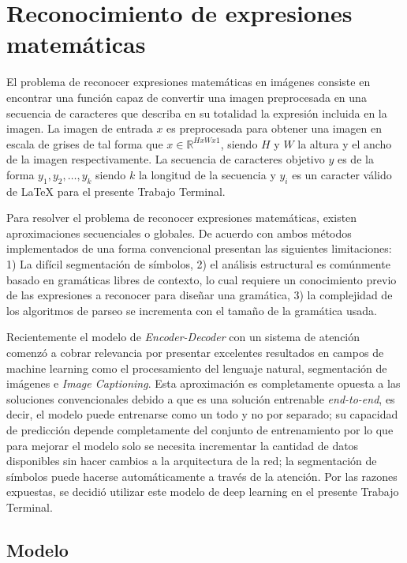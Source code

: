 \newpage
\section{Reconocimiento de expresiones matemáticas}

El problema de reconocer expresiones matemáticas en imágenes consiste en encontrar una función capaz de convertir una imagen preprocesada en una secuencia de caracteres que describa en su totalidad la expresión incluida en la imagen. La imagen de entrada $x$ es preprocesada para obtener una imagen en escala de grises de tal forma que $x \in \mathbb{R} ^ {H x W x 1}$, siendo $H$ y $W$ la altura y el ancho de la imagen respectivamente. La secuencia de caracteres objetivo $y$ es de la forma $y_{1}, y_{2}, \dots , y_{k}$ siendo $k$ la longitud de la secuencia y $y_{i}$ es un caracter válido de \LaTeX{} para el presente Trabajo Terminal.

Para resolver el problema de reconocer expresiones matemáticas, existen aproximaciones secuenciales o globales. De acuerdo con \cite{superprecision} ambos métodos implementados de una forma convencional presentan las siguientes limitaciones: 1) La difícil segmentación de símbolos, 2) el análisis estructural es comúnmente basado en gramáticas libres de contexto, lo cual requiere un conocimiento previo de las expresiones a reconocer para diseñar una gramática, 3) la complejidad de los algoritmos de parseo se incrementa con el tamaño de la gramática usada.

Recientemente el modelo de \textit{Encoder-Decoder} con un sistema de atención comenzó a cobrar relevancia por presentar excelentes resultados en campos de machine learning como el procesamiento del lenguaje natural, segmentación de imágenes e \textit{Image Captioning}. Esta aproximación es completamente opuesta a las soluciones convencionales debido a que es una solución entrenable \textit{end-to-end}, es decir, el modelo puede entrenarse como un todo y no por separado; su capacidad de predicción depende completamente del conjunto de entrenamiento por lo que para mejorar el modelo solo se necesita incrementar la cantidad de datos disponibles sin hacer cambios a la arquitectura de la red; la segmentación de símbolos puede hacerse automáticamente a través de la atención. Por las razones expuestas, se decidió utilizar este modelo de deep learning en el presente Trabajo Terminal.

\subsection{Modelo}

